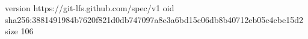 version https://git-lfs.github.com/spec/v1
oid sha256:3881491984b7620f821d0db747097a8e3a6bd15c06db8b40712eb05c4cbe15d2
size 106
